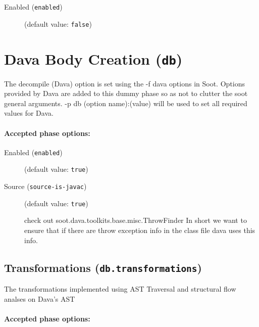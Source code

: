 \documentclass{article}
\begin{document}
\begin{description}

\item[Enabled ({\tt enabled})]
(default value: {\tt false})






\end{description}

\section{Dava Body Creation ({\tt db})}

The decompile (Dava) option is set using the -f dava options in Soot.
Options provided by Dava are added to this dummy phase so as not to clutter the soot general arguments.
-p db (option name):(value) will be used to set all required values for Dava. 
                                

\paragraph{Accepted phase options:} 

\begin{description}

\item[Enabled ({\tt enabled})]
(default value: {\tt true})






\item[Source ({\tt source-is-javac})]
(default value: {\tt true})




					check out soot.dava.toolkits.base.misc.ThrowFinder
					In short we want to ensure that if there are throw exception info in the class file dava uses this info.					
					


\end{description}

\subsection{Transformations ({\tt db.transformations})}

					The transformations implemented using AST Traversal and structural flow analses on Dava's AST
					

\paragraph{Accepted phase options:} 
\end{document}
